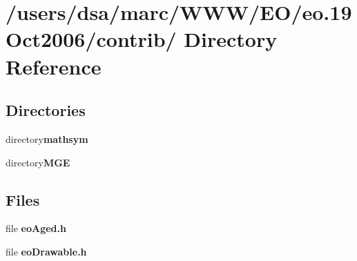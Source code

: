 \section{/users/dsa/marc/WWW/EO/eo.19Oct2006/contrib/ Directory Reference}
\label{dir_000007}
\subsection*{Directories}
\begin{CompactItemize}
\item 
directory{\bf mathsym}
\item 
directory{\bf MGE}
\end{CompactItemize}
\subsection*{Files}
\begin{CompactItemize}
\item 
file {\bf eoAged.h}
\item 
file {\bf eoDrawable.h}
\end{CompactItemize}

